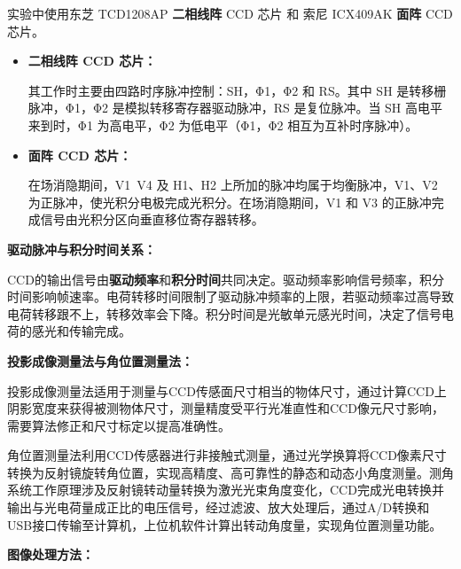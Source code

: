 \documentclass[dvipsnames, svgnames,a4paper,11pt]{article}
\begin{document}
	实验中使用东芝 TCD1208AP \textbf{二相线阵} CCD 芯片 和 索尼 ICX409AK \textbf{面阵} CCD 芯片。
	\begin{itemize}
		\item \textbf{二相线阵 CCD 芯片：}

			其工作时主要由四路时序脉冲控制：SH，Φ1，Φ2 和 RS。其中 SH 是转移栅脉冲，Φ1，Φ2 是模拟转移寄存器驱动脉冲，RS 是复位脉冲。当 SH 高电平来到时，Φ1 为高电平，Φ2 为低电平（Φ1，Φ2 相互为互补时序脉冲）。

		\item \textbf{面阵 CCD 芯片：}

			在场消隐期间，V1~V4 及 H1、H2 上所加的脉冲均属于均衡脉冲，V1、V2 为正脉冲，使光积分电极完成光积分。在场消隐期间，V1 和 V3 的正脉冲完成信号由光积分区向垂直移位寄存器转移。
	\end{itemize}



	\textbf{驱动脉冲与积分时间关系：}

		
		CCD的输出信号由\textbf{驱动频率}和\textbf{积分时间}共同决定。驱动频率影响信号频率，积分时间影响帧速率。电荷转移时间限制了驱动脉冲频率的上限，若驱动频率过高导致电荷转移跟不上，转移效率会下降。积分时间是光敏单元感光时间，决定了信号电荷的感光和传输完成。



	\vspace{5mm}
	\textbf{投影成像测量法与角位置测量法：}

		
		投影成像测量法适用于测量与CCD传感面尺寸相当的物体尺寸，通过计算CCD上阴影宽度来获得被测物体尺寸，测量精度受平行光准直性和CCD像元尺寸影响，需要算法修正和尺寸标定以提高准确性。

		角位置测量法利用CCD传感器进行非接触式测量，通过光学换算将CCD像素尺寸转换为反射镜旋转角位置，实现高精度、高可靠性的静态和动态小角度测量。测角系统工作原理涉及反射镜转动量转换为激光光束角度变化，CCD完成光电转换并输出与光电荷量成正比的电压信号，经过滤波、放大处理后，通过A/D转换和USB接口传输至计算机，上位机软件计算出转动角度量，实现角位置测量功能。
	


	\textbf{图像处理方法：}
\end{document}
